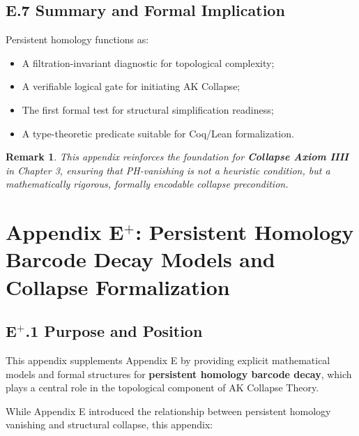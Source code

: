 \documentclass[11pt]{article}
\newtheorem{remark}[theorem]{Remark}
\begin{document}
\subsection*{E.7 Summary and Formal Implication}

Persistent homology functions as:

\begin{itemize}
    \item A filtration-invariant diagnostic for topological complexity;
    \item A verifiable logical gate for initiating AK Collapse;
    \item The first formal test for structural simplification readiness;
    \item A type-theoretic predicate suitable for Coq/Lean formalization.
\end{itemize}

\begin{remark}
This appendix reinforces the foundation for \textbf{Collapse Axiom IIII} in Chapter 3, ensuring that PH-vanishing is not a heuristic condition, but a mathematically rigorous, formally encodable collapse precondition.
\end{remark}




\section*{Appendix E$^{+}$: Persistent Homology Barcode Decay Models and Collapse Formalization}

\subsection*{E$^{+}$.1 Purpose and Position}

This appendix supplements Appendix E by providing explicit mathematical models and formal structures for \textbf{persistent homology barcode decay}, which plays a central role in the topological component of AK Collapse Theory.

While Appendix E introduced the relationship between persistent homology vanishing and structural collapse, this appendix:
\end{document}
